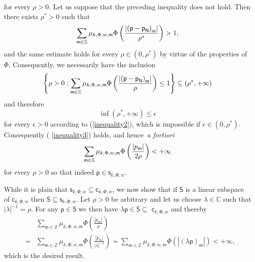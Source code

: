 \documentclass{article}
\begin{document}
for every $\rho >0$. Let us suppose that the preceding inequality does not
hold. Then there exists $\rho ^{\ast }>0$ such that%
\begin{equation*}
\sum_{\mathsf{m}\in \mathbb{Z}}\mu _{k,\Phi ,w,\mathsf{m}}\Phi \left( \frac{%
\left\vert \left( \mathsf{p-p}_{\mathsf{N}}\right) _{\mathsf{m}}\right\vert 
}{\rho ^{\ast }}\right) >1,
\end{equation*}%
and the same estimate holds for every $\rho \in \left( 0,\rho ^{\ast
}\right) $ by virtue of the properties of $\Phi $. Consequently, we
necessarily have the inclusion%
\begin{equation*}
\left\{ \rho >0:\sum_{\mathsf{m}\in \mathbb{Z}}\mu _{k,\Phi ,w,\mathsf{m}%
}\Phi \left( \frac{\left\vert \left( \mathsf{p-p}_{\mathsf{N}}\right) _{%
\mathsf{m}}\right\vert }{\rho }\right) \leq 1\right\} \subseteq \left( \rho
^{\ast },+\infty \right)
\end{equation*}%
and therefore%
\begin{equation*}
\inf \left( \rho ^{\ast },+\infty \right) \leq \epsilon
\end{equation*}%
for every $\epsilon >0$ according to (\ref{inequality2}), which is
impossible if $\epsilon \in \left( 0,\rho ^{\ast }\right) $. Consequently (%
\ref{inequality3}) holds, and hence\textit{\ a fortiori}%
\begin{equation*}
\sum_{\mathsf{m}\in \mathbb{Z}}\mu _{k,\Phi ,w,\mathsf{m}}\Phi \left( \frac{%
\left\vert p_{\mathsf{m}}\right\vert }{2\rho }\right) <+\infty
\end{equation*}%
for every $\rho >0$ so that indeed $\mathsf{p}\in \mathsf{s}_{k,\Phi ,w}$.

While it is plain that $\mathsf{s}_{k,\Phi ,w}\subseteq \mathsf{c}_{k,\Phi
,w}$, we now show that if $\mathsf{S}$ is a linear subspace of $\mathsf{c}%
_{k,\Phi ,w}$ then $\mathsf{S}\subseteq \mathsf{s}_{k,\Phi ,w}$. Let $\rho
>0 $ be arbitrary and let us choose $\lambda \in \mathbb{C}$ such that $%
\left\vert \lambda \right\vert ^{-1}=\rho $. For any $\mathsf{p\in S}$ we
then have $\lambda \mathsf{p}\in \mathsf{S}\subseteq $ $\mathsf{c}_{k,\Phi
,w}$ and thereby%
\begin{eqnarray*}
&&\sum_{\mathsf{m}\in \mathbb{Z}}\mu _{k,\Phi ,w,\mathsf{m}}\Phi \left( 
\frac{\left\vert p_{\mathsf{m}}\right\vert }{\rho }\right) \\
&=&\sum_{\mathsf{m}\in \mathbb{Z}}\mu _{k,\Phi ,w,\mathsf{m}}\Phi \left( 
\frac{\left\vert p_{\mathsf{m}}\right\vert }{\left\vert \lambda \right\vert
^{-1}}\right) =\sum_{\mathsf{m}\in \mathbb{Z}}\mu _{k,\Phi ,w,\mathsf{m}%
}\Phi \left( \left\vert \left( \lambda \mathsf{p}\right) _{\mathsf{m}%
}\right\vert \right) <+\infty ,
\end{eqnarray*}%
which is the desired result.
\end{document}
